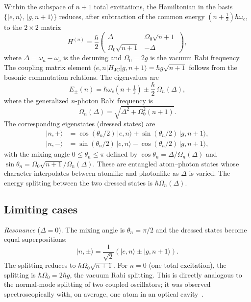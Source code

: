 \documentclass[%
 reprint,
 amsmath,amssymb,
 aps,
 floatfix,
]{revtex4-2}
\begin{document}
Within the subspace of $n{+}1$ total excitations, the Hamiltonian in the basis $\{|e, n\rangle,\, |g, n{+}1\rangle\}$ reduces, after subtraction of the common energy $(n + \tfrac{1}{2})\hbar\omega_c$, to the $2 \times 2$ matrix
\begin{equation}
H^{(n)} = \frac{\hbar}{2}
\begin{pmatrix}
\Delta & \Omega_0\sqrt{n+1} \\
\Omega_0\sqrt{n+1} & -\Delta
\end{pmatrix},
\label{eq:2x2}
\end{equation}
where $\Delta = \omega_a - \omega_c$ is the detuning and $\Omega_0 = 2g$ is the vacuum Rabi frequency. The coupling matrix element $\langle e, n | H_{\text{JC}} | g, n{+}1\rangle = \hbar g\sqrt{n+1}$ follows from the bosonic commutation relations. The eigenvalues are
\begin{equation}
E_{\pm}(n) = \hbar\omega_c\left(n + \tfrac{1}{2}\right) \pm \frac{\hbar}{2}\,\Omega_n(\Delta),
\label{eq:eigenvalues}
\end{equation}
where the generalized $n$-photon Rabi frequency is
\begin{equation}
\Omega_n(\Delta) = \sqrt{\Delta^2 + \Omega_0^2(n+1)}.
\label{eq:gen_rabi}
\end{equation}
The corresponding eigenstates (dressed states) are
\begin{align}
|n,+\rangle &= \cos(\theta_n/2)\, |e,n\rangle + \sin(\theta_n/2)\, |g,n{+}1\rangle, \label{eq:dressed_plus}\\
|n,-\rangle &= \sin(\theta_n/2)\, |e,n\rangle - \cos(\theta_n/2)\, |g,n{+}1\rangle, \label{eq:dressed_minus}
\end{align}
with the mixing angle $0 \leq \theta_n \leq \pi$ defined by $\cos\theta_n = \Delta/\Omega_n(\Delta)$ and $\sin\theta_n = \Omega_0\sqrt{n+1}/\Omega_n(\Delta)$. These are entangled atom--photon states whose character interpolates between atomlike and photonlike as $\Delta$ is varied. The energy splitting between the two dressed states is $\hbar\Omega_n(\Delta)$.


\subsection{Limiting cases}
\label{sec:limits}

\textit{Resonance} ($\Delta = 0$). The mixing angle is $\theta_n = \pi/2$ and the dressed states become equal superpositions:
\begin{equation}
|n, \pm\rangle = \frac{1}{\sqrt{2}}\left(|e,n\rangle \pm |g,n{+}1\rangle\right).
\end{equation}
The splitting reduces to $\hbar\Omega_0\sqrt{n+1}$. For $n = 0$ (one total excitation), the splitting is $\hbar\Omega_0 = 2\hbar g$, the vacuum Rabi splitting. This is directly analogous to the normal-mode splitting of two coupled oscillators; it was observed spectroscopically with, on average, one atom in an optical cavity~\cite{thompson1992}.
\end{document}
